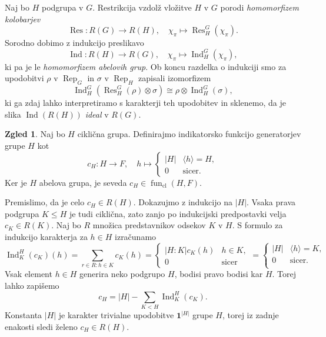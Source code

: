 \documentclass[11pt]{book}
\def\11{\mathbf{1}}
\DeclareMathOperator\Res{Res}
\DeclareMathOperator\Ind{Ind}
\DeclareMathOperator\Rep{Rep}
\DeclareMathOperator\cl{cl}
\DeclareMathOperator\fun{fun}
\theoremstyle{definition}
\theoremstyle{zgled}
\newtheorem*{zgled}{Zgled}
\theoremstyle{odprtproblem}
\theoremstyle{domacanaloga}
\theoremstyle{izrek}
\begin{document}
Naj bo $H$ podgrupa v $G$. Restrikcija vzdolž vložitve $H$ v $G$ porodi \emph{homomorfizem kolobarjev}
\[
    \textstyle \Res \colon R(G) \to R(H), \quad \chi_{\pi} \mapsto \Res^G_H(\chi_{\pi}).
\]
Sorodno dobimo z indukcijo preslikavo
\[
    \textstyle \Ind \colon R(H) \to R(G), \quad \chi_{\pi} \mapsto \Ind^G_H(\chi_{\pi}),
\]
ki pa je le \emph{homomorfizem abelovih grup}. Ob koncu razdelka o indukciji smo za upodobitvi $\rho$ v $\Rep_G$ in $\sigma$ v $\Rep_H$ zapisali izomorfizem
\[
    \textstyle \Ind^G_H(\Res^G_H(\rho) \otimes \sigma) \cong
        \rho \otimes \Ind^G_H(\sigma),
\]
ki ga zdaj lahko interpretiramo s karakterji teh upodobitev in sklenemo, da je slika $\Ind(R(H))$ \emph{ideal} v $R(G)$.

\begin{zgled}
Naj bo $H$ ciklična grupa. Definirajmo indikatorsko funkcijo generatorjev grupe $H$ kot
\[
    c_H \colon H \to F, \quad
    h \mapsto \begin{cases} |H| & \langle h \rangle = H, \\ 0 & \text{sicer.} \end{cases}
\]
Ker je $H$ abelova grupa, je seveda $c_H \in \fun_{\cl}(H,F)$. 

Premislimo, da je celo $c_H \in R(H)$. Dokazujmo z indukcijo na $|H|$. Vsaka prava podgrupa $K \leq H$ je tudi ciklična, zato zanjo po indukcijski predpostavki velja $c_K \in R(K)$. Naj bo $R$ množica predstavnikov odsekov $K$ v $H$. S formulo za indukcijo karakterja za $h \in H$ izračunamo
\[
    {\textstyle \Ind^H_K(c_K)(h)} = \sum_{r \in R \colon h \in K} c_K(h) =
    \begin{cases} |H:K| c_K(h) & h \in K, \\ 0 & \text{sicer}  \end{cases} =
    \begin{cases}  |H| & \langle h \rangle = K, \\ 0 & \text{sicer.} \\ \end{cases}
\]
Vsak element $h \in H$ generira neko podgrupo $H$, bodisi pravo bodisi kar $H$. Torej lahko zapišemo
\[
    c_H = |H| - \sum_{K < H} \textstyle  \Ind^H_K(c_K).
\]
Konstanta $|H|$ je karakter trivialne upodobitve $\11^{|H|}$ grupe $H$, torej iz zadnje enakosti sledi želeno $c_H \in R(H)$. 
\end{zgled}
\end{document}
